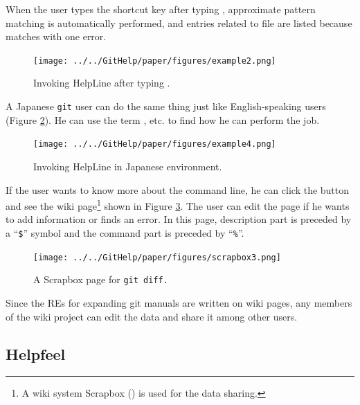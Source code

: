 \documentclass[manuscript,anonymous,review]{acmart}
\def\HL{\textsf{HelpLine}}
\def\GIT{\texttt{git}}
\def\ES{\textsf{ExpandSearch}}
\def\SB{\textsf{Scrapbox}}
\begin{document}
When the user types the shortcut key
after typing ,
approximate pattern matching is automatically performed, and
entries related to  file are listed because
 matches  with one error.

\begin{figure}[H]
  \texttt{[image: ../../GitHelp/paper/figures/example2.png]}
  \caption{Invoking {\HL} after typing .}
  \label{example2}
\end{figure}

A Japanese {\GIT} user can do the same thing just like
English-speaking users (Figure \ref{example3}).
He can use the term , etc. to find how he can perform the job.

\begin{figure}[H]
  \texttt{[image: ../../GitHelp/paper/figures/example4.png]}
  \caption{Invoking {\HL} in Japanese environment.}
  \label{example3}
\end{figure}

If the user wants to know more about the command line,
he can click the
button and see the wiki page\footnote{
  A wiki system {\SB} () is used for the data sharing.
} shown in Figure \ref{scrapboxpage}.
The user can edit the page if he wants to add information or finds an error.
In this page, description part is preceded by a ``\texttt{\$}'' symbol and
the command part is preceded by ``\texttt{\%}''.

\begin{figure}[H]
  \centerline{\texttt{[image: ../../GitHelp/paper/figures/scrapbox3.png]}}
  \caption{A {\SB} page for \tt{git diff}.}
  \label{scrapboxpage}
\end{figure}

Since the REs for expanding git manuals are written on wiki pages,
any members of the wiki project can edit the data and share it among other users.

% 

\subsection{Helpfeel}
\end{document}
